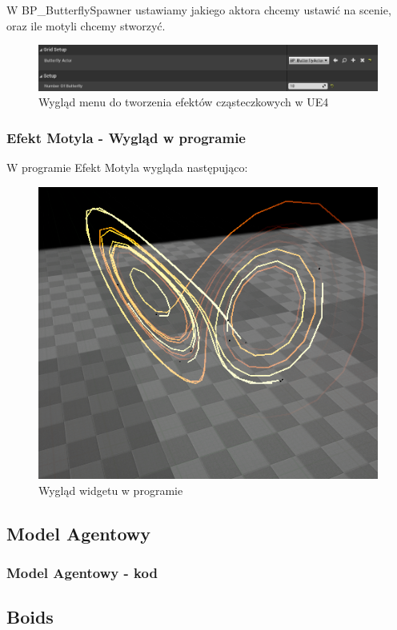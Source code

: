 \documentclass[a4paper,12pt,reqno]{article}
\begin{document}
W BP\_ButterflySpawner ustawiamy jakiego aktora chcemy ustawić na scenie, oraz ile motyli chcemy stworzyć.

\begin{figure}[H]%
\centering
\includegraphics[width=0.7\columnwidth]{graphics/ButterflySpawner.png}
\caption{Wygląd menu do tworzenia efektów cząsteczkowych w UE4 
\label{BPExample}}%
%
\qquad
\end{figure} 



\subsubsection{Efekt Motyla - Wygląd w programie}
W programie Efekt Motyla wygląda następująco:

\begin{figure}[H]%
\centering
\includegraphics[width=0.7\columnwidth]{graphics/ButterflyInUE_1.png}
\caption{Wygląd widgetu w programie
\label{BPExample}}%
%
\qquad
\end{figure}  

\subsection{Model Agentowy}
\subsubsection{Model Agentowy - kod}
\subsection{Boids}
\end{document}
